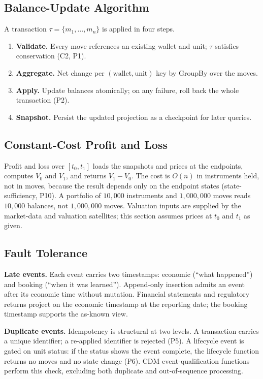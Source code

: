\subsection{Balance-Update Algorithm}
\label{sec:sec11-update}

A transaction $\tau=\{m_1,\dots,m_n\}$ is applied in four steps.

\begin{enumerate}[nosep]
\item \textbf{Validate.} Every move references an existing wallet and unit; $\tau$ satisfies conservation (C2, P1).
\item \textbf{Aggregate.} Net change per $(\text{wallet},\text{unit})$ key by GroupBy over the moves.
\item \textbf{Apply.} Update balances atomically; on any failure, roll back the whole transaction (P2).
\item \textbf{Snapshot.} Persist the updated projection as a checkpoint for later queries.
\end{enumerate}

\subsection{Constant-Cost Profit and Loss}
\label{sec:sec11-pnl}

Profit and loss over $[t_0,t_1]$ loads the snapshots and prices at the endpoints, computes $V_0$ and $V_1$, and returns $V_1-V_0$. The cost is $O(n)$ in instruments held, not in moves, because the result depends only on the endpoint states (state-sufficiency, P10). A portfolio of $10{,}000$ instruments and $1{,}000{,}000$ moves reads $10{,}000$ balances, not $1{,}000{,}000$ moves. Valuation inputs are supplied by the market-data and valuation satellites; this section assumes prices at $t_0$ and $t_1$ as given.

\subsection{Fault Tolerance}
\label{sec:sec11-faults}

\noindent\textbf{Late events.} Each event carries two timestamps: economic (``what happened'') and booking (``when it was learned''). Append-only insertion admits an event after its economic time without mutation. Financial statements and regulatory returns project on the economic timestamp at the reporting date; the booking timestamp supports the as-known view.

\noindent\textbf{Duplicate events.} Idempotency is structural at two levels. A transaction carries a unique identifier; a re-applied identifier is rejected (P5). A lifecycle event is gated on unit status: if the status shows the event complete, the lifecycle function returns no moves and no state change (P6). CDM event-qualification functions perform this check, excluding both duplicate and out-of-sequence processing.

